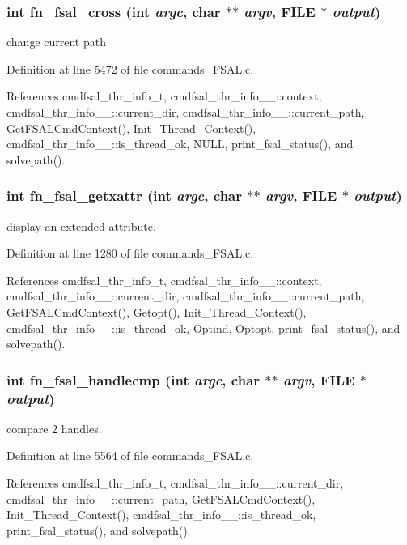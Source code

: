 \subsubsection{\setlength{\rightskip}{0pt plus 5cm}int fn\_\-fsal\_\-cross (int {\em argc}, char $\ast$$\ast$ {\em argv}, FILE $\ast$ {\em output})}\label{commands_8h_a31}


change current path 

Definition at line 5472 of file commands\_\-FSAL.c.

References cmdfsal\_\-thr\_\-info\_\-t, cmdfsal\_\-thr\_\-info\_\-\_\-::context, cmdfsal\_\-thr\_\-info\_\-\_\-::current\_\-dir, cmdfsal\_\-thr\_\-info\_\-\_\-::current\_\-path, Get\-FSALCmd\-Context(), Init\_\-Thread\_\-Context(), cmdfsal\_\-thr\_\-info\_\-\_\-::is\_\-thread\_\-ok, NULL, print\_\-fsal\_\-status(), and solvepath().
\subsubsection{\setlength{\rightskip}{0pt plus 5cm}int fn\_\-fsal\_\-getxattr (int {\em argc}, char $\ast$$\ast$ {\em argv}, FILE $\ast$ {\em output})}\label{commands_8h_a34}


display an extended attribute. 

Definition at line 1280 of file commands\_\-FSAL.c.

References cmdfsal\_\-thr\_\-info\_\-t, cmdfsal\_\-thr\_\-info\_\-\_\-::context, cmdfsal\_\-thr\_\-info\_\-\_\-::current\_\-dir, cmdfsal\_\-thr\_\-info\_\-\_\-::current\_\-path, Get\-FSALCmd\-Context(), Getopt(), Init\_\-Thread\_\-Context(), cmdfsal\_\-thr\_\-info\_\-\_\-::is\_\-thread\_\-ok, Optind, Optopt, print\_\-fsal\_\-status(), and solvepath().
\subsubsection{\setlength{\rightskip}{0pt plus 5cm}int fn\_\-fsal\_\-handlecmp (int {\em argc}, char $\ast$$\ast$ {\em argv}, FILE $\ast$ {\em output})}\label{commands_8h_a32}


compare 2 handles. 

Definition at line 5564 of file commands\_\-FSAL.c.

References cmdfsal\_\-thr\_\-info\_\-t, cmdfsal\_\-thr\_\-info\_\-\_\-::current\_\-dir, cmdfsal\_\-thr\_\-info\_\-\_\-::current\_\-path, Get\-FSALCmd\-Context(), Init\_\-Thread\_\-Context(), cmdfsal\_\-thr\_\-info\_\-\_\-::is\_\-thread\_\-ok, print\_\-fsal\_\-status(), and solvepath().
